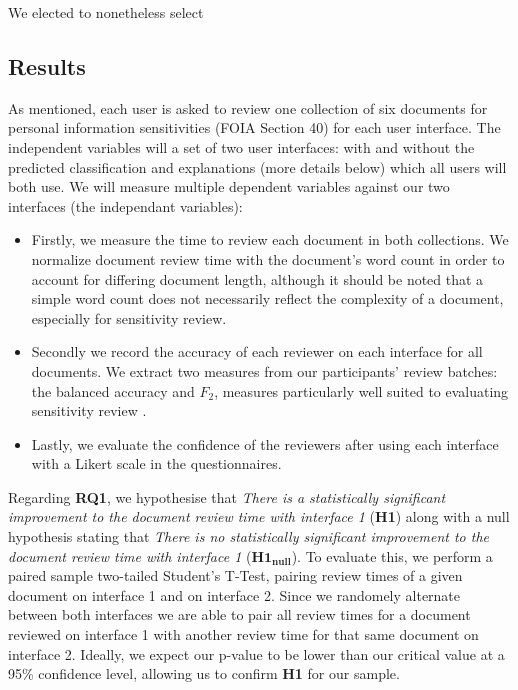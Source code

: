 \documentclass[\version]{l4proj}
\begin{document}
We elected to nonetheless select

\subsection{Results}

As mentioned, each user is asked to review one collection of six documents for personal information sensitivities (FOIA Section 40) for each user interface.
The independent variables will a set of two user interfaces: with and without the predicted classification and explanations (more details below) which all users will both use. We will measure multiple dependent variables against our two interfaces (the independant variables):

\begin{itemize}
    \item Firstly, we measure the time to review each document in both collections.
          We normalize document review time with the document's word count in order to account for differing document length, although it should be noted that a simple word count does not necessarily reflect the complexity of a document, especially for sensitivity review.
    \item Secondly we record the accuracy of each reviewer on each interface for all documents.
          We extract two measures from our participants' review batches: the balanced accuracy and \(F_{2}\), measures particularly well suited to evaluating sensitivity review \autocite{mcdonaldStudySVMKernel2017}.
    \item Lastly, we evaluate the confidence of the reviewers after using each interface with a Likert scale in the questionnaires.
\end{itemize}

Regarding \textbf{RQ1}, we hypothesise that \textit{There is a statistically significant improvement to the document review time with interface 1} (\textbf{H1}) along with a null hypothesis stating that \textit{There is no statistically significant improvement to the document review time with interface 1} (\(\mathbf{H1_{null}}\)).
To evaluate this, we perform a paired sample two-tailed Student's T-Test, pairing review times of a given document on interface 1 and on interface 2.
Since we randomely alternate between both interfaces we are able to pair all review times for a document reviewed on interface 1 with another review time for that same document on interface 2.
Ideally, we expect our p-value to be lower than our critical value at a 95\% confidence level, allowing us to confirm \textbf{H1} for our sample.
\end{document}
